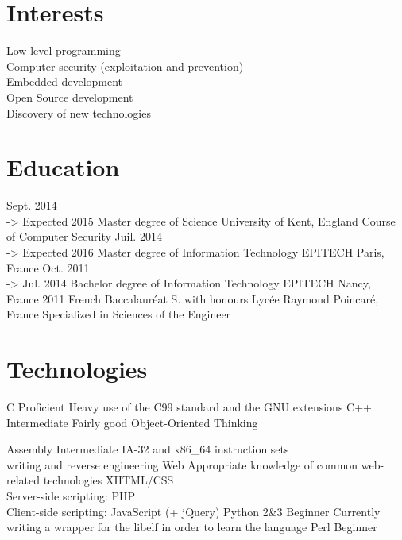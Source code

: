 \documentclass[]{friggeri-cv}
\begin{document}
\section{Interests}

Low level programming\\
Computer security (exploitation and prevention)\\
Embedded development\\
Open Source development\\
Discovery of new technologies

\section{Education}

\begin{entrylist}
  \entry
    {Sept. 2014\\-> Expected 2015}
    {Master degree of Science}
    {University of Kent, England}
    {Course of Computer Security}
  \entry
    {Juil. 2014\\-> Expected 2016}
    {Master degree of Information Technology}
    {EPITECH Paris, France}
    {}
  \entry
    {Oct. 2011\\-> Jul. 2014}
    {Bachelor degree of Information Technology}
    {EPITECH Nancy, France}
    {}
  \entry
    {2011}
    {French Baccalauréat S. with honours}
    {Lycée Raymond Poincaré, France}
    {Specialized in Sciences of the Engineer}
\end{entrylist}

\section{Technologies}
\begin{entrylist}
  \entry
    {C}
    {Proficient}
    {}
    {Heavy use of the C99 standard and the GNU extensions}
  \entry
    {C++}
    {Intermediate}
    {}
    {Fairly good Object-Oriented Thinking}
\end{entrylist}      %
\begin{entrylist}    %
  \entry
    {Assembly}
    {Intermediate}
    {}
    {IA-32 and x86\_64 instruction sets\\
    writing and reverse engineering}
  \entry
    {Web}
    {Appropriate knowledge of common web-related technologies}
    {}
    {XHTML/CSS\\
        Server-side scripting: PHP\\
        Client-side scripting: JavaScript (+ jQuery)
    }
  \entry
    {Python 2\&3}
    {Beginner}
    {}
    {Currently writing a wrapper for the libelf in order to learn the language}
  \entry
    {Perl}
    {Beginner}
    {}
    {}
\end{entrylist}
\end{document}
